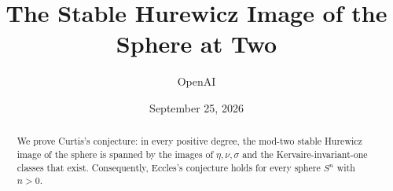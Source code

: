 \documentclass[11pt]{article}
\title{The Stable Hurewicz Image of the Sphere at Two}
\author{OpenAI}
\date{September 25, 2026}
\begin{document}
\maketitle
\begin{abstract}
We prove Curtis's conjecture: in every positive degree, the mod-two
stable Hurewicz image of the sphere is spanned by the images of
\(\eta,\nu,\sigma\) and the Kervaire-invariant-one classes that exist.
Consequently, Eccles's conjecture holds for every sphere \(S^n\) with
\(n>0\).
\end{abstract}
\setcounter{tocdepth}{1}
\tableofcontents






\clearpage
\begingroup
\small
\setlength{\parskip}{0pt}


\endgroup
\end{document}
